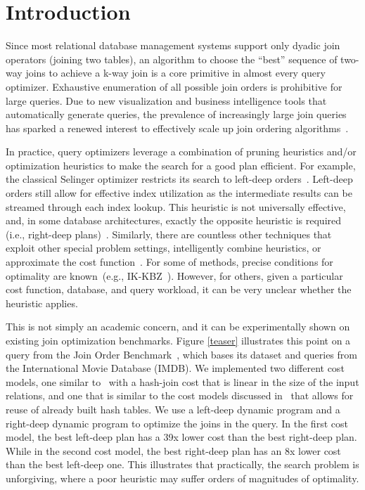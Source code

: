 \section{Introduction}\label{intro}\sloppy
{}
Since most relational database management systems support only dyadic join operators (joining two tables), an algorithm to choose the ``best'' sequence of two-way joins to achieve a k-way join is a core primitive in almost every query optimizer.
Exhaustive enumeration of all possible join orders is prohibitive for large queries.
Due to new visualization and business intelligence tools that automatically generate queries, the prevalence of increasingly large join queries has sparked a renewed interest to effectively scale up join ordering algorithms~\cite{neumann2018adaptive}. 

In practice, query optimizers leverage a combination of pruning heuristics and/or optimization heuristics to make the search for a good plan efficient.
For example, the classical Selinger optimizer restricts its search to left-deep orders~\cite{selinger1979access}.
Left-deep orders still allow for effective index utilization as the intermediate results can be streamed through each index lookup. 
This heuristic is not universally effective, and, in some database architectures, exactly the opposite heuristic is required (i.e., right-deep plans)~\cite{gerber1986data}.
Similarly, there are countless other techniques that exploit other special problem settings, intelligently combine heuristics, or approximate the cost function~\cite{swami1993polynomial,steinbrunn1997heuristic,galindo2008optimizing,ziane1993parallel}. 
For some of methods, precise conditions for optimality are known~(e.g., IK-KBZ~\cite{krishnamurthy1986optimization}). However, for others, given a particular cost function, database, and query workload, it can be very unclear whether the heuristic applies. 

This is not simply an academic concern, and it can be experimentally shown on existing join optimization benchmarks.
Figure \ref{teaser} illustrates this point on a query from the Join Order Benchmark~\cite{leis2015good}, which bases its dataset and queries from the International Movie Database (IMDB). We implemented two different cost models, one similar to~\cite{leis2015good} with a hash-join cost that is linear in the size of the input relations, and one that is similar to the cost models discussed in~\cite{ziane1993parallel} that allows for reuse of already built hash tables.
We use a left-deep dynamic program and a right-deep dynamic program to optimize the joins in the query.
In the first cost model, the best left-deep plan has a 39x lower cost than the best right-deep plan. While in the second cost model, the best right-deep plan has an 8x lower cost than the best left-deep one.
This illustrates that practically, the search problem is unforgiving, where a poor heuristic may suffer orders of magnitudes of optimality.


